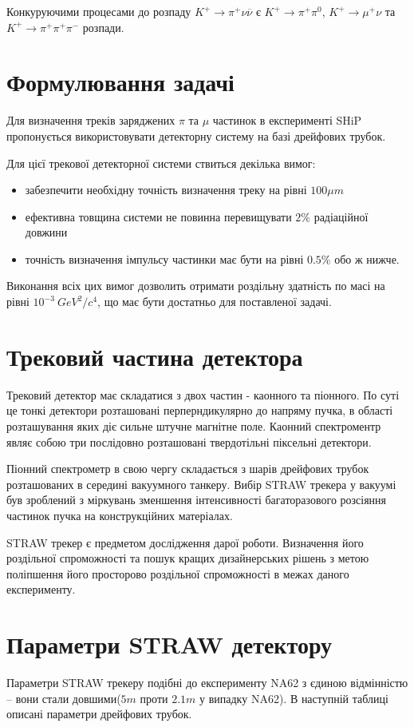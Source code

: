 \documentclass[]{article}
\begin{document}
		Конкуруючими процесами до розпаду 
		$ K^+ \rightarrow \pi^+\nu \overline{\nu} $ є 
		$ K^+ \rightarrow \pi^+\pi^0 $, 
		$ K^+ \rightarrow \mu^+ \nu $ та 
		$ K^+ \rightarrow \pi^+ \pi^+ \pi^- $ розпади.
		
		\section{Формулювання задачі}
		Для визначення треків заряджених $\pi$ та $\mu$ частинок в експерименті SHiP пропонується використовувати детекторну систему на базі дрейфових трубок.
		
		Для цієї трекової детекторної системи ствиться декілька вимог:
		\begin{itemize}
		\item забезпечити необхідну точність визначення треку на рівні $100 \mu m$
		\item ефективна товщина системи не повинна перевищувати $2\%$ радіаційної довжини
		\item точність визначення імпульсу частинки має бути на рівні $0.5\%$ обо ж нижче.
\end{itemize}
		Виконання всіх цих вимог дозволить отримати роздільну здатність по масі на рівні $10^{-3}~GeV^2 / c^4$, що має бути достатньо для поставленої задачі.
		\section{Трековий частина детектора}
		Трековий детектор має складатися з двох частин - каонного та піонного. По суті це тонкі детектори розташовані перперндикулярно до напряму пучка, в області розташування яких діє сильне штучне магнітне поле. Каонний спектроментр являє собою три послідовно розташовані твердотільні піксельні детектори.
		
		Піонний спектрометр в свою чергу складається з шарів дрейфових трубок розташованих в середині вакуумного танкеру. Вибір STRAW трекера у вакуумі був зроблений з міркувань зменшення інтенсивності багаторазового розсіяння частинок пучка на конструкційних матеріалах.
		
		STRAW трекер є предметом дослідження дарої роботи. Визначення його роздільної спроможності та пошук кращих дизайнерських рішень з метою поліпшення його просторово роздільної спроможності в межах даного експерименту.
		 
		\section{Параметри STRAW детектору}
		Параметри STRAW трекеру подібні до експерименту NA62 з єдиною відмінністю -- вони стали довшими($5m$ проти $2.1m$ у випадку NA62). В наступній таблиці описані параметри дрейфових трубок.
\end{document}
